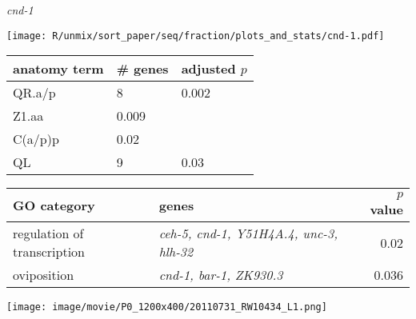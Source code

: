 \documentclass[serif,9pt]{beamer}
\begin{document}
\begin{frame}{{\em cnd-1}}
\begin{minipage}{0.4\textwidth}
\texttt{[image: R/unmix/sort\_paper/seq/fraction/plots\_and\_stats/cnd-1.pdf]}
\end{minipage}
\begin{minipage}{0.58\textwidth}
\begin{table}[!tbp]\scriptsize
\begin{tabular}{lll}
anatomy term & \# genes & adjusted $p$ \\
\hline
QR.a/p & 8 & 0.002 \\
Z1.aa & 0.009 \\
C(a/p)p & 0.02 \\
QL & 9 & 0.03 \\
\end{tabular}
\end{table}
\end{minipage}

\begin{table}\footnotesize
\begin{tabular}{llr}
GO category & genes & $p$ value \\
\hline
regulation of transcription & {\em ceh-5, cnd-1, Y51H4A.4, unc-3, hlh-32} & 0.02 \\
oviposition & {\em cnd-1, bar-1, ZK930.3} & 0.036 \\
\end{tabular}
\end{table}

\texttt{[image: image/movie/P0\_1200x400/20110731\_RW10434\_L1.png]}

\end{frame}
\end{document}
